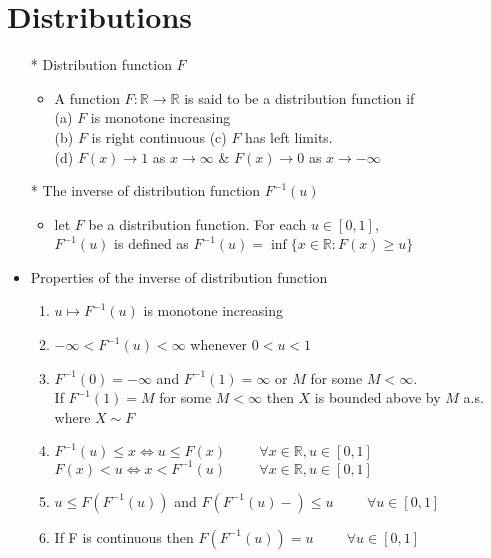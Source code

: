\documentclass[12pt, A4]{article}
\begin{document}
\section{Distributions}
\begin{itemize}
	\item[*] Distribution function $F$
	\begin{itemize}
		\item A function $F : \mathbb{R}\rightarrow \mathbb{R}$ is said to be a distribution function if \\ (a) $F$ is monotone increasing \\(b) $F$ is right continuous \quad (c) $F$ has left limits. \\ (d) $F(x)\rightarrow 1$ as $x\rightarrow \infty$\hspace{0.2cm} \& $ F(x)\rightarrow 0$ as $x\rightarrow -\infty$
	\end{itemize}
	\item[*] The inverse of distribution function $F^{-1}(u)$
	\begin{itemize}
		\item let $F$ be a distribution function. For each $u\in {[0,1]}$, \\$F^{-1}(u)$ is defined as $F^{-1}(u)=\inf\{x\in \mathbb{R} : F(x)\geq u\}$
	\end{itemize}
	\item Properties of the inverse of distribution function
	\begin{enumerate}
		\item $u\mapsto F^{-1}(u)$ is monotone increasing
		\item $-\infty<F^{-1}(u)<\infty$ whenever $0<u<1$
		\item $F^{-1}(0)=-\infty$ and $F^{-1}(1)=\infty$ or $M$ for some $M<\infty$.
		\\ If  $F^{-1}(1)=M$ for some $M<\infty$ then $X$ is bounded above by $M$ a.s. where $X\sim F$
		\item $F^{-1}(u)\leq x \Leftrightarrow u\leq F(x) \hspace{1cm} \forall x\in \mathbb{R}, u \in [0,1]$ 
		\newline $F(x)<u \Leftrightarrow x<F^{-1}(u) \hspace{1cm} \forall x\in \mathbb{R}, u \in [0,1]$ 
		\item $u\leq F(F^{-1}(u))$ and $F(F^{-1}(u)-)\leq u \hspace{1cm} \forall u\in [0,1]$
		\item If F is continuous then $F(F^{-1}(u))=u \hspace{1cm} \forall u\in [0,1]$

\end{enumerate}
\end{itemize}
\end{document}
